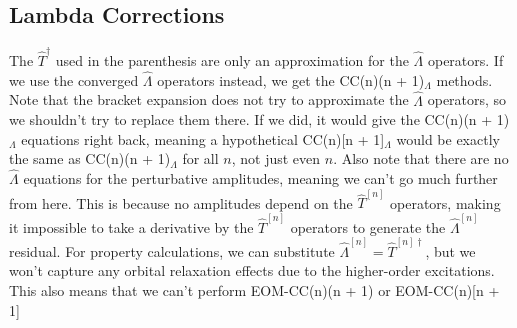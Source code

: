 \documentclass{article}
\begin{document}
\subsection{Lambda Corrections}

The $\hat{T}^\dagger$ used in the parenthesis are only an approximation for the $\hat{\Lambda}$ operators. If we use the converged $\hat{\Lambda}$ operators instead, we get the CC(n)(n + 1)$_\Lambda$ methods. Note that the bracket expansion does not try to approximate the $\hat{\Lambda}$ operators, so we shouldn't try to replace them there. If we did, it would give the CC(n)(n + 1)$_\Lambda$ equations right back, meaning a hypothetical CC(n)[n + 1]$_\Lambda$ would be exactly the same as CC(n)(n + 1)$_\Lambda$ for all $n$, not just even $n$. Also note that there are no $\hat{\Lambda}$ equations for the perturbative amplitudes, meaning we can't go much further from here. This is because no amplitudes depend on the $\hat{T}^{\left[n\right]}$ operators, making it impossible to take a derivative by the $\hat{T}^{\left[n\right]}$ operators to generate the $\hat{\Lambda}^{\left[n\right]}$ residual. For property calculations, we can substitute $\hat{\Lambda}^{\left[n\right]} = \hat{T}^{\left[n\right]\dagger}$, but we won't capture any orbital relaxation effects due to the higher-order excitations. This also means that we can't perform EOM-CC(n)(n + 1) or EOM-CC(n)[n + 1]
\end{document}
